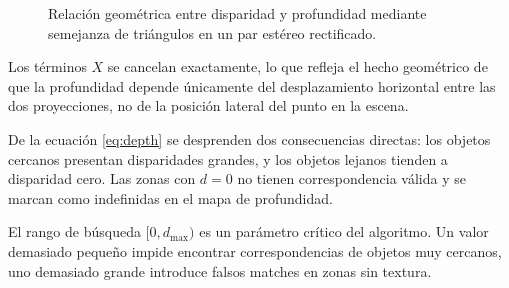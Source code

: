 \documentclass[
10pt, %
a4paper, %
oneside, %
headinclude,footinclude, %
BCOR=5mm, %
]{scrartcl}
\begin{document}
\begin{figure}[H]
    \caption{Relación geométrica entre disparidad y profundidad mediante semejanza de triángulos en un par estéreo rectificado.}
    \label{fig:triangulacion_stereo}
\end{figure}

Los términos $X$ se cancelan exactamente, lo que refleja el hecho geométrico
de que la profundidad depende únicamente del desplazamiento horizontal entre
las dos proyecciones, no de la posición lateral del punto en la escena.

De la ecuación \eqref{eq:depth} se desprenden dos consecuencias
directas: los objetos cercanos presentan disparidades grandes, y los
objetos lejanos tienden a disparidad cero. Las zonas con $d = 0$
no tienen correspondencia válida y se marcan como indefinidas en
el mapa de profundidad.

El rango de búsqueda $[0, d_{\max})$ es un parámetro crítico del
algoritmo. Un valor demasiado pequeño impide encontrar correspondencias
de objetos muy cercanos, uno demasiado grande introduce falsos matches
en zonas sin textura.
\end{document}

